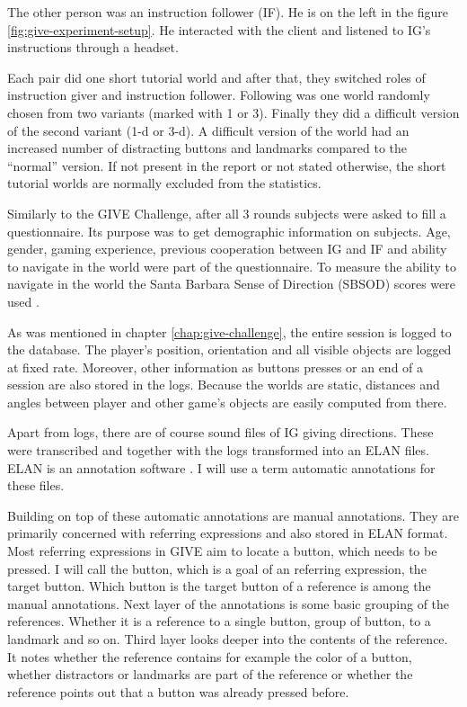 The other person was an instruction follower (IF). He is on the left in the figure \ref{fig:give-experiment-setup}. He interacted with the client and listened to IG's instructions through a headset.

Each pair did one short tutorial world and after that, they switched roles of instruction giver and instruction follower. Following was one world randomly chosen from two variants (marked with 1 or 3). Finally they did a difficult version of the  second variant (1-d or 3-d). A difficult version of the world had an increased number of distracting buttons and landmarks compared to the ``normal'' version. If not present in the report or not stated otherwise, the short tutorial worlds are normally excluded from the statistics.

Similarly to the GIVE Challenge, after all 3 rounds subjects were asked to fill a questionnaire. Its purpose was to get demographic information on subjects. Age, gender,  gaming experience, previous cooperation between IG and IF and ability to navigate in the world were part of the questionnaire. To measure the ability to navigate in the world the Santa Barbara Sense of Direction (SBSOD) scores were used \citet{hegarty2002development}.

As was mentioned in chapter \ref{chap:give-challenge}, the entire session is logged to the database. The player's position, orientation and all visible objects are logged at fixed rate. Moreover, other information as buttons presses or an end of a session are also stored in the logs. Because the worlds are static, distances and angles between player and other game's objects are easily computed from there.

Apart from logs, there are of course sound files of IG giving directions. These were transcribed and together with the logs transformed into an ELAN files. ELAN is an annotation software \citep{sloetjes2008annotation}. I will use a term automatic annotations for these files. 

Building on top of these automatic annotations are manual annotations. They are primarily concerned with referring expressions and also stored in ELAN format. Most referring expressions in GIVE aim to locate a button, which needs to be pressed. I will call the button, which is a goal of an referring expression, the target button. Which button is the target button of a reference is among the manual annotations. Next layer of the annotations is some basic grouping of the references. Whether it is a reference to a single button, group of button, to a landmark and so on. Third layer looks deeper into the contents of the reference. It notes whether the reference contains for example the color of a button, whether distractors or landmarks are part of the reference or whether the reference points out that a button was already pressed before.

